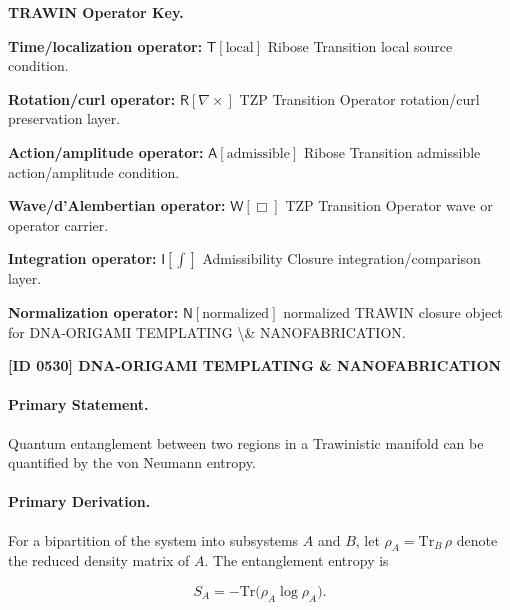 \par\vspace{0.45\baselineskip}
\noindent\begin{minipage}[t]{\linewidth}
\begingroup
\small
\raggedright
\textbf{TRAWIN Operator Key.}\par
\noindent\textbf{Time/localization operator:} $\mathsf{T}\!\left[\mathrm{local}\right]$ Ribose Transition local source condition.\par
\noindent\textbf{Rotation/curl operator:} $\mathsf{R}\!\left[\nabla\times\right]$ TZP Transition Operator rotation/curl preservation layer.\par
\noindent\textbf{Action/amplitude operator:} $\mathsf{A}\!\left[\mathrm{admissible}\right]$ Ribose Transition admissible action/amplitude condition.\par
\noindent\textbf{Wave/d'Alembertian operator:} $\mathsf{W}\!\left[\Box\right]$ TZP Transition Operator wave or operator carrier.\par
\noindent\textbf{Integration operator:} $\mathsf{I}\!\left[\int\right]$ Admissibility Closure integration/comparison layer.\par
\noindent\textbf{Normalization operator:} $\mathsf{N}\!\left[\mathrm{normalized}\right]$ normalized TRAWIN closure object for DNA-ORIGAMI TEMPLATING \textbackslash{}\& NANOFABRICATION.\par
\endgroup
\end{minipage}

\clearpage
\noindent\textbf{[ID 0530] DNA-ORIGAMI TEMPLATING \& NANOFABRICATION}\par
\vspace{0.35em}
\paragraph{Primary Statement.}

Quantum entanglement between two regions in a Trawinistic manifold can be quantified by the von Neumann entropy.

\paragraph{Primary Derivation.}

For a bipartition of the system into subsystems $A$ and $B$, let $\rho_A = \mathrm{Tr}_B\,\rho$ denote the reduced density matrix of $A$.  The entanglement entropy is

\begin{equation}
S_A = -\mathrm{Tr}\big( \rho_A\log\rho_A \big).
\end{equation}

